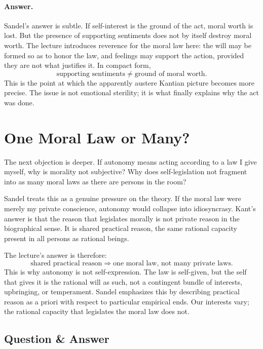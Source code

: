 \paragraph{Answer.} Sandel's answer is subtle. If self-interest is the ground of the act, moral worth is lost. But the presence of supporting sentiments does not by itself destroy moral worth. The lecture introduces reverence for the moral law here: the will may be formed so as to honor the law, and feelings may support the action, provided they are not what justifies it. In compact form,
\begin{equation}
\text{supporting sentiments} \neq \text{ground of moral worth}.
\end{equation}
This is the point at which the apparently austere Kantian picture becomes more precise. The issue is not emotional sterility; it is what finally explains why the act was done.

\section{One Moral Law or Many?}

The next objection is deeper. If autonomy means acting according to a law I give myself, why is morality not subjective? Why does self-legislation not fragment into as many moral laws as there are persons in the room?

Sandel treats this as a genuine pressure on the theory. If the moral law were merely my private conscience, autonomy would collapse into idiosyncrasy. Kant's answer is that the reason that legislates morally is not private reason in the biographical sense. It is shared practical reason, the same rational capacity present in all persons as rational beings.

The lecture's answer is therefore:
\begin{equation}
\text{shared practical reason} \Longrightarrow \text{one moral law, not many private laws}.
\end{equation}
This is why autonomy is not self-expression. The law is self-given, but the self that gives it is the rational will as such, not a contingent bundle of interests, upbringing, or temperament. Sandel emphasizes this by describing practical reason as a priori with respect to particular empirical ends. Our interests vary; the rational capacity that legislates the moral law does not.

\subsection{Question \& Answer}

